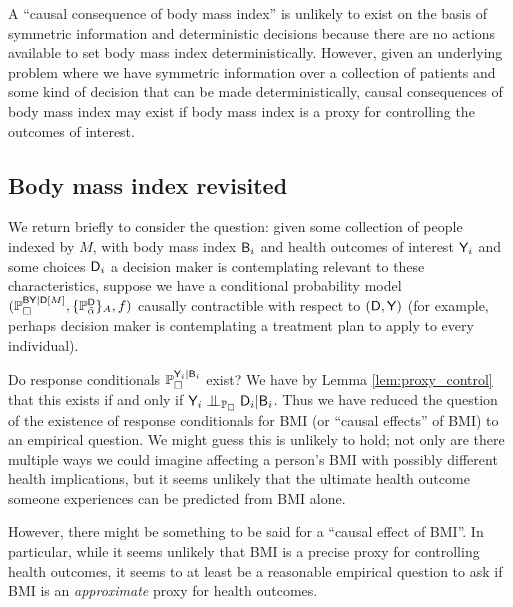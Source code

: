 A ``causal consequence of body mass index'' is unlikely to exist on the basis of symmetric information and deterministic decisions because there are no actions available to set body mass index deterministically. However, given an underlying problem where we have symmetric information over a collection of patients and some kind of decision that can be made deterministically, causal consequences of body mass index may exist if body mass index is a proxy for controlling the outcomes of interest.

\subsection{Body mass index revisited}

We return briefly to consider the question: given some collection of people indexed by $M$, with body mass index $\mathsf{B}_i$ and health outcomes of interest $\mathsf{Y}_i$ and some choices $\mathsf{D}_i$ a decision maker is contemplating relevant to these characteristics, suppose we have a conditional probability model $(\mathbb{P}_\square^{\mathsf{BY}|\mathsf{D}[M]},\{\mathbb{P}_{\tilde{\alpha}}^{\mathsf{D}}\}_A,f)$ causally contractible with respect to $(\mathsf{D},\mathsf{Y})$ (for example, perhaps decision maker is contemplating a treatment plan to apply to every individual).

Do response conditionals $\mathbb{P}_\square^{\mathsf{Y}_i|\mathsf{B}_i}$ exist? We have by Lemma \ref{lem:proxy_control} that this exists if and only if $\RV{Y}_i\CI_{\prob{P}_\square} \RV{D}_i|\RV{B}_i$. Thus we have reduced the question of the existence of response conditionals for BMI (or ``causal effects'' of BMI) to an empirical question. We might guess this is unlikely to hold; not only are there multiple ways we could imagine affecting a person's BMI with possibly different health implications, but it seems unlikely that the ultimate health outcome someone experiences can be predicted from BMI alone.

However, there might be something to be said for a ``causal effect of BMI''. In particular, while it seems unlikely that BMI is a precise proxy for controlling health outcomes, it seems to at least be a reasonable empirical question to ask if BMI is an \emph{approximate} proxy for health outcomes.